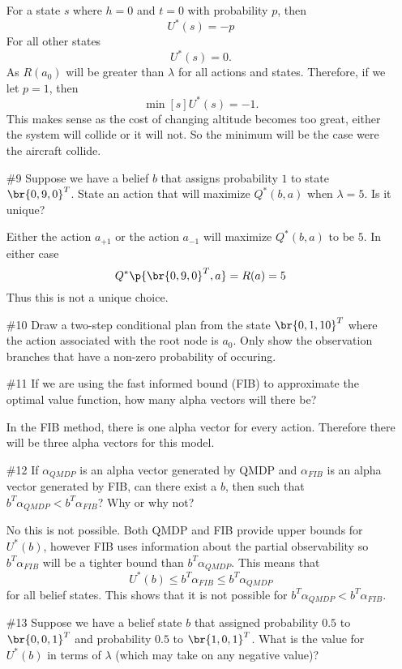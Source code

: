 \documentclass[12pt, oneside]{article}
\begin{document}
\begin{enumerate}
    For a state $s$ where $h = 0$ and $t = 0$ with probability $p$, then
    \[
      U^*(s) = -p
    \]
    For all other states
    \[
      U^*(s) = 0.
    \]
    As $R(a_0)$ will be greater than $\lambda$ for all actions and states.
    Therefore, if we let $p = 1$, then
    \[
      \min[s]{U^*(s)} = -1.
    \]
    This makes sense as the cost of changing altitude becomes too great, either
    the system will collide or it will not.
    So the minimum will be the case were the aircraft collide.

  \item[\#9] %
    Suppose we have a belief $b$ that assigns probability $1$ to state $\br{0, 9, 0}^T$.
    State an action that will maximize $Q^*(b, a)$ when $\lambda = 5$.
    Is it unique?

    Either the action $a_{+1}$ or the action $a_{-1}$ will maximize
    $Q^*(b, a)$ to be $5$.
    In either case
    \[
      Q^*\p{\br{0, 9, 0}^T, a} = R(a) = 5
    \]
    Thus this is not a unique choice.

  \item[\#10]
    Draw a two-step conditional plan from the state $\br{0, 1, 10}^T$ where the
    action associated with the root node is $a_0$.
    Only show the observation branches that have a non-zero probability of
    occuring.

  \item[\#11] %
    If we are using the fast informed bound (FIB) to approximate the optimal
    value function, how many alpha vectors will there be?

    In the FIB method, there is one alpha vector for every action.
    Therefore there will be three alpha vectors for this model.

  \item[\#12] %
    If $\alpha_{QMDP}$ is an alpha vector generated by QMDP and $\alpha_{FIB}$
    is an alpha vector generated by FIB, can there exist a $b$, then such that
    $b^T \alpha_{QMDP} < b^T \alpha_{FIB}$?
    Why or why not?

    No this is not possible.
    Both QMDP and FIB provide upper bounds for $U^*(b)$, however FIB uses
    information about the partial observability so $b^T \alpha_{FIB}$ will be a
    tighter bound than $b^T \alpha_{QMDP}$.
    This means that
    \[
      U^*(b) \le b^T \alpha_{FIB} \le b^T \alpha_{QMDP}
    \]
    for all belief states.
    This shows that it is not possible for
    $b^T \alpha_{QMDP} < b^T \alpha_{FIB}$.

  \item[\#13] %
    Suppose we have a belief state $b$ that assigned probability $0.5$ to
    $\br{0, 0, 1}^T$ and probability $0.5$ to $\br{1, 0, 1}^T$.
    What is the value for $U^*(b)$ in terms of $\lambda$ (which may take on any
    negative value)?


\end{enumerate}
\end{document}
